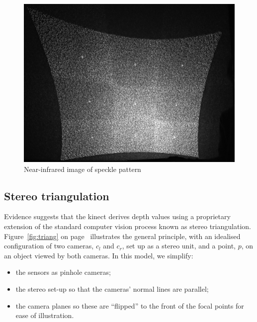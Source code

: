 \begin{figure}[ht]
    \begin{center}
        \includegraphics[width=1.0\textwidth]{images/whole_pattern.pdf}
        \caption{Near-infrared image of speckle pattern}
        \label{fig:pattern1}
    \end{center}
\end{figure}


\subsection{Stereo triangulation}
\label{sub:triang}

Evidence suggests that the kinect derives depth values using a proprietary
extension of the standard computer vision process known as stereo triangulation.
Figure~\ref{fig:triang} on page~\pageref{fig:triang} illustrates the general
principle, with an idealised configuration of two cameras, $c_{l}$ and $c_{r}$,
set up as a stereo unit, and a point, $p$, on an object viewed by both cameras.
In this model, we simplify: \begin{itemize}

    \item   the sensors as pinhole cameras;

    \item   the stereo set-up so that the cameras' normal lines are parallel;

    \item   the camera planes so these are ``flipped'' to the front of the focal points
    for ease of illustration.

\end{itemize}

